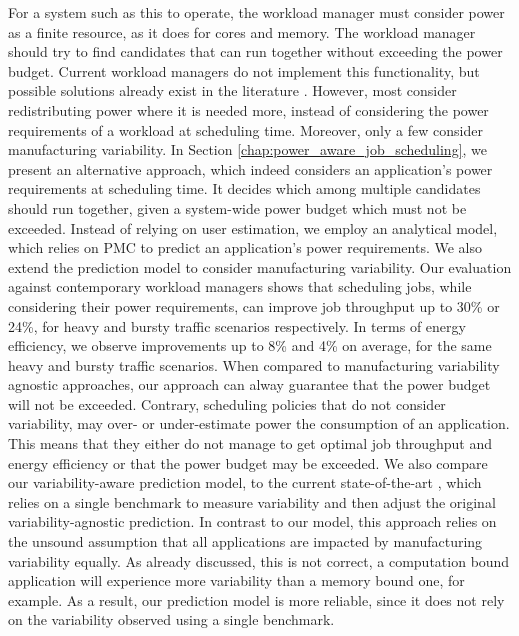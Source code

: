 For a system such as this to operate, the workload manager must consider power as a finite
resource, as it does for cores and memory.  The workload manager should try to find
candidates that can run together without exceeding the power budget.  Current workload
managers do not implement this functionality, but possible solutions already exist in the
literature
\cite{patki:2013:eho:2464996.2465009,7515666,Inadomi:2015:AMI:2807591.2807638,Gholkar:2016:PTH:2967938.2967961,Ellsworth:2015:DPS:2807591.2807643,Bailey:2015:FLP:2807591.2807637,Teodorescu:2008:VAS:1381306.1382152,Totoni:tech:2014}.
However, most consider redistributing power where it is needed more, instead of
considering the power requirements of a workload at scheduling time.  Moreover, only a few
consider manufacturing variability.  In Section \ref{chap:power_aware_job_scheduling}, we
present an alternative approach, which indeed considers an application's power
requirements at scheduling time.  It decides which among multiple candidates should run
together, given a system-wide power budget which must not be exceeded.  Instead of relying
on user estimation, we employ an analytical model, which relies on PMC to predict an
application's power requirements.  We also extend the prediction model to consider
manufacturing variability.  Our evaluation against contemporary workload managers shows
that scheduling jobs, while considering their power requirements, can improve job
throughput up to 30\% or 24\%, for heavy and bursty traffic scenarios respectively.  In
terms of energy efficiency, we observe improvements up to 8\% and 4\% on average, for the
same heavy and bursty traffic scenarios.  When compared to manufacturing variability
agnostic approaches, our approach can alway guarantee that the power budget will not be
exceeded.  Contrary, scheduling policies that do not consider variability, may over- or
under-estimate power the consumption of an application.  This means that they either do
not manage to get optimal job throughput and energy efficiency or that the power budget
may be exceeded.  We also compare our variability-aware prediction model, to the current
state-of-the-art \cite{Inadomi:2015:AMI:2807591.2807638}, which relies on a single
benchmark to measure variability and then adjust the original variability-agnostic
prediction.  In contrast to our model, this approach relies on the unsound assumption that
all applications are impacted by manufacturing variability equally.  As already discussed,
this is not correct, a computation bound application will experience more variability than
a memory bound one, for example.  As a result, our prediction model is more reliable,
since it does not rely on the variability observed using a single benchmark.   
 
